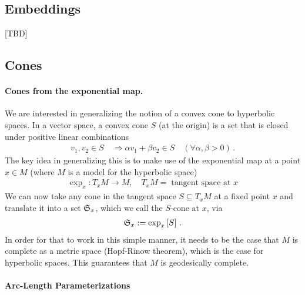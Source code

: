 \documentclass{article}
\begin{document}
\subsection*{Embeddings}

[TBD]

\subsection*{Cones}

\paragraph{Cones from the exponential map.} 
We are interested in generalizing the notion of a convex cone to hyperbolic spaces.  In a vector space, a convex cone $S$ (at the origin) is a set that is closed under positive linear combinations
\begin{align}
v_1, v_2 \in S  \quad \Longrightarrow \alpha v_1 + \beta v_2 \in S \quad  (\forall \alpha, \beta >0) \,.
\end{align}
The key idea in generalizing this is to make use of the exponential map at a point $x \in M$ (where $M$ is a model for the hyperbolic space)
\begin{align}
\exp_x: T_xM  \to M,\quad T_xM  =\; \text{tangent space at $x$}
\end{align}
We can now take any cone in the tangent space $S \subseteq T_xM$ at a fixed point $x$ and translate it into a set $\frak S_x$, which we call the $S$-cone at $x$, via 
\begin{align}
\frak S_x := \exp_x \left[ S \right] \,.
\end{align}
In order for that to work in this simple manner, it needs to be the case that $M$ is complete as a metric space (Hopf-Rinow theorem), which is the case for hyperbolic spaces. This guarantees that $M$ is geodesically complete.


\paragraph{Arc-Length Parameterizations}
\end{document}
